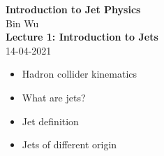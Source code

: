 \documentclass[9pt,a4paper,unknownkeysallowed,xcolor=dvipsnames,aspectratio=43]{beamer}
\begin{document}
\begin{frame}
\vspace*{\fill}
\begin{center}
{\Huge\bf\color{darkred} Introduction to Jet Physics}\\
\vspace{4mm}
    Bin Wu\\
    \vspace{8mm}
    {\bf\Large Lecture 1: Introduction to Jets}\\\vspace{4mm}
    {\color{darkblue} 14-04-2021}
\end{center}
\vspace{4mm}
\begin{itemize}
    \item[\color{darkred}\Large\bullet] Hadron collider kinematics
    \vspace{2mm}
    \item[\color{darkred}\Large\bullet] What are jets?
    \vspace{2mm}
    \item[\color{darkred}\Large\bullet] Jet definition
    \vspace{2mm}
    \item[\color{darkred}\Large\bullet] Jets of different origin
\end{itemize}
\vspace*{\fill}
\end{frame}
\end{document}
